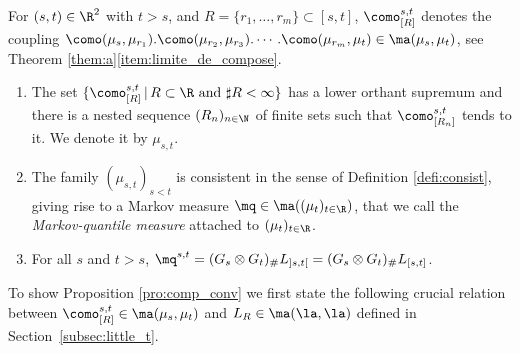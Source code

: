 \label{subsec:preuve_premier}

\begin{reminder} For $(s,t)\in\R^2$ with $t>s$, and $R=\{r_1,\ldots,r_m\}\subset[s,t]$, $\como^{s,t}_{[R]}$ denotes the coupling $\como(\mu_{s},\mu_{r_1}).\como(\mu_{r_2},\mu_{r_3}).\cdots.\como(\mu_{r_{m}},\mu_{t})\in\ma(\mu_s,\mu_t)$, see Theorem \ref{them:a}\eqref{item:limite_de_compose}.
\end{reminder}

\skpt
\begin{prodefinition}\label{pro:comp_conv}
\begin{enumerate}
\item
\label{aaa} The set $\{\como^{s,t}_{[R]}\,|\,R\subset \R\ \text{and}\ \sharp R<\infty\}$ has a lower orthant supremum and there is a nested sequence $(R_n)_{n\in \N}$ of finite sets such that $\como^{s,t}_{[R_n]}$ tends to it. We denote it by $\mu_{s,t}$.

\item
\label{bbb} The family $(\mu_{s,t})_{s<t}$ is consistent in the sense of Definition \ref{defi:consist}, giving rise to a Markov measure $\mq\in\ma((\mu_t)_{t\in\R})$, that we call the \emph{Markov-quantile measure} attached to $(\mu_t)_{t\in\R}$.

\item
\label{ccc} For all $s$ and $t>s$, $\mq^{s,t}=(G_s\otimes G_t)_\#L_{]s,t[}=(G_s\otimes G_t)_\#L_{[s,t]}$.
\end{enumerate}
\end{prodefinition}

To show Proposition \ref{pro:comp_conv} we first state the following crucial relation between $\como^{s,t}_{[R]}\in \ma(\mu_s,\mu_t)$ and $L_R\in \ma(\la,\la)$ defined in Section~\ref{subsec:little_t}.

